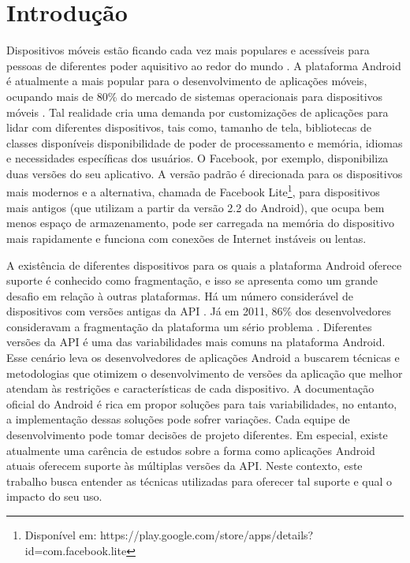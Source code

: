 \chapter{Introdução} \label{ch:introducao}

Dispositivos móveis estão ficando cada vez mais populares e acessíveis para
pessoas de diferentes poder aquisitivo ao redor do mundo \cite{Lhamas2014}.
A plataforma Android é atualmente a mais popular para o desenvolvimento de
aplicações móveis, ocupando mais de 80\% do mercado de sistemas operacionais
para dispositivos móveis \cite{jim2014}. Tal realidade cria uma
demanda por customizações de aplicações para lidar com diferentes dispositivos,
tais como, tamanho de tela, bibliotecas de classes disponíveis 
disponibilidade de poder de processamento e memória, idiomas e
necessidades específicas dos usuários. O Facebook, por exemplo, disponibiliza
duas versões do seu aplicativo. A versão padrão é direcionada para os dispositivos
mais modernos e a alternativa, chamada de Facebook Lite\footnote{Disponível em:
https://play.google.com/store/apps/details?id=com.facebook.lite},
para dispositivos mais antigos (que utilizam a partir da versão 2.2 do Android),
que ocupa bem menos espaço de armazenamento, pode ser carregada na memória do
dispositivo mais rapidamente e funciona com conexões de Internet instáveis ou lentas.

A existência de diferentes dispositivos para os quais a plataforma Android oferece
suporte é conhecido como fragmentação, e isso se apresenta como um grande desafio
em relação à outras plataformas. Há um número considerável de dispositivos com versões
antigas da API \cite{Gronli2014}. Já em 2011, 86\% dos desenvolvedores consideravam
a fragmentação da plataforma um sério problema \cite{Elmer-DeWitt2011}.
Diferentes versões da API é uma das variabilidades mais comuns na plataforma Android.
Esse cenário leva os desenvolvedores de aplicações Android a buscarem técnicas e
metodologias que otimizem o desenvolvimento de versões da aplicação que melhor
atendam às restrições e características de cada dispositivo. A documentação oficial
do Android \cite{GuiaAndroid} é rica em propor soluções para tais variabilidades,
no entanto, a implementação dessas soluções pode sofrer variações. Cada equipe
de desenvolvimento pode tomar decisões de projeto diferentes. Em especial, existe
atualmente uma carência de estudos sobre a forma como aplicações Android atuais
oferecem suporte às múltiplas versões da API. Neste contexto, este trabalho busca
entender as técnicas utilizadas para oferecer tal suporte e qual o impacto do seu uso.

